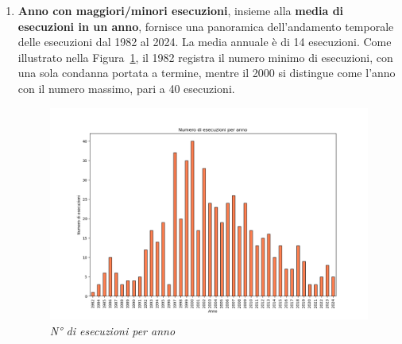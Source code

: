 \documentclass[11pt]{article}
\begin{document}
\begin{enumerate}
    \item \textbf{Anno con maggiori/minori esecuzioni}, insieme alla \textbf{media di esecuzioni in un anno}, fornisce una panoramica dell’andamento temporale delle esecuzioni dal 1982 al 2024. La media annuale è di 14 esecuzioni. Come illustrato nella Figura~\ref{fig:esecuzioni_anno}, il 1982 registra il numero minimo di esecuzioni, con una sola condanna portata a termine, mentre il 2000 si distingue come l’anno con il numero massimo, pari a 40 esecuzioni.
    \begin{figure}
        \centering
        \includegraphics[width=1\linewidth]{grafico_esecuzioni_anno.png}
        \caption{\textit{N° di esecuzioni per anno}}
        \label{fig:esecuzioni_anno}
    \end{figure}
    

\end{enumerate}
\end{document}
